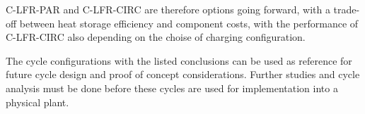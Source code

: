 \begin{paracol}{2}
C-LFR-PAR and C-LFR-CIRC are therefore options going forward, with a trade-off between heat storage efficiency and component costs, with the performance of C-LFR-CIRC also depending on the choise of charging configuration.

The cycle configurations with the listed conclusions can be used as reference for future cycle design and proof of concept considerations. Further studies and cycle analysis must be done before these cycles are used for implementation into a physical plant. 

\end{paracol}









